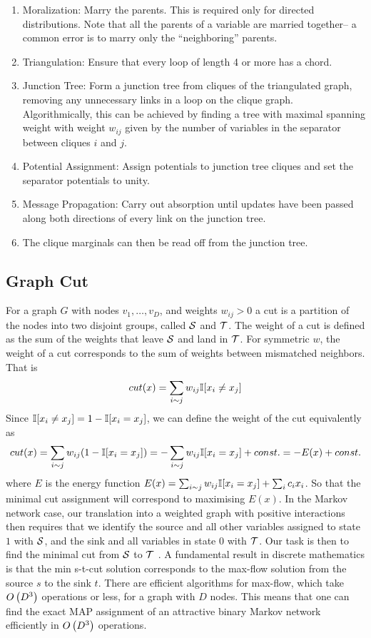 \begin{enumerate}
	\item Moralization: Marry the parents. This is required only for directed distributions. Note that all the parents of a variable are married together-- a common error is to marry only the ``neighboring'' parents.
	\item Triangulation: Ensure that every loop of length 4 or more has a chord.
	\item Junction Tree:  Form a junction tree from cliques of the triangulated graph, removing any unnecessary links in a loop on the clique graph. Algorithmically, this can be achieved by finding a tree with maximal spanning weight with weight $w_{ij}$ given by the number of variables in the separator between cliques $i$ and $j$.
	\item Potential Assignment: Assign potentials to junction tree cliques and set the separator potentials to unity.
	\item Message Propagation: Carry out absorption until updates have been passed along both directions of every link on the junction tree.
	\item The clique marginals can then be read off from the junction tree.
\end{enumerate}

\subsection{Graph Cut}

For a graph $G$ with nodes $v_1,\dotsc,v_D$, and weights $w_{ij}>0$ a cut is a partition of the nodes into two disjoint groups, called $\mathcal{S}$ and $\mathcal{T}$. The weight of a cut is defined as the sum of the weights that leave $\mathcal{S}$ and land in $\mathcal{T}$. For symmetric $w$, the weight of a cut corresponds to the sum of weights between mismatched neighbors. That is
\begin{align*}
cut(x)=\sum_{i\sim j}w_{ij}\mathbb{I}[x_i\neq x_j]
\end{align*}
Since $\mathbb{I}[x_i\neq x_j]=1-\mathbb{I}[x_i=x_j]$, we can define the weight of the cut equivalently as
\begin{align*}
cut(x)=\sum_{i\sim j}w_{ij}(1-\mathbb{I}[x_i=x_j])=-\sum_{i\sim j}w_{ij}\mathbb{I}[x_i=x_j]+const.=-E(x)+const.
\end{align*}
where $E$ is the energy function $E(x)=\sum_{i\sim j}w_{ij}\mathbb{I}[x_i=x_j]+\sum_ic_ix_i$. So that the minimal cut assignment will correspond to maximising $E(x)$. In the Markov network case, our translation into a weighted graph with positive interactions then requires that we identify the source and all other variables assigned to state $1$ with $\mathcal{S}$, and the sink and all variables in state $0$ with $\mathcal{T}$. Our task is then to find the minimal cut from $\mathcal{S}$ to $\mathcal{T}$ . A fundamental result in discrete mathematics is that the min s-t-cut solution corresponds to the max-flow solution from the source $s$ to the sink $t$. There are efficient algorithms for max-flow, which take $O\left(D^3\right)$ operations or less, for a graph with $D$ nodes. This means that one can find the exact MAP assignment of an attractive binary Markov network efficiently in $O\left(D^3\right)$ operations.
